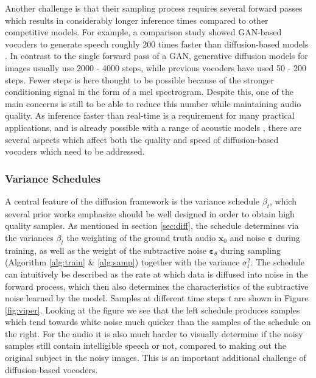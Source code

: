 \documentclass{report}
\begin{document}
Another challenge is that their sampling process requires several forward passes which results in considerably longer inference times compared to other competitive models. For example, a comparison study showed GAN-based vocoders to generate speech roughly 200 times faster than diffusion-based models \cite{albadawy2022vocbench}. In contrast to the single forward pass of a GAN, generative diffusion models for images usually use 2000 - 4000 steps, while previous vocoders have used 50 - 200 steps. Fewer steps is here thought to be possible because of the stronger conditioning signal in the form of a mel spectrogram. Despite this, one of the main concerns is still to be able to reduce this number while maintaining audio quality. As inference faster than real-time is a requirement for many practical applications, and is already possible with a range of acoustic models \cite{ren2020fastspeech, luo2021lightspeech}, there are several aspects which affect both the quality and speed of diffusion-based vocoders which need to be addressed.

\subsubsection{Variance Schedules}
A central feature of the diffusion framework is the variance schedule $\beta_t$, which several prior works emphasize should be well designed in order to obtain high quality samples. As mentioned in section \ref{sec:diff}, the schedule determines via the variances $\beta_t$ the weighting of the ground truth audio $\bm{x}_0$ and noise $\bm{\varepsilon}$ during training, as well as the weight of the subtractive noise $\bm{\varepsilon}_{\theta}$ during sampling (Algorithm \ref{alg:train} \& \ref{alg:samp}) together with the variance $\sigma_t^2$. The schedule can intuitively be described as the rate at which data is diffused into noise in the forward process, which then also determines the characteristics of the subtractive noise learned by the model. Samples at different time steps $t$ are shown in Figure \ref{fig:viper}. Looking at the figure we see that the left schedule produces samples which tend towards white noise much quicker than the samples of the schedule on the right. For the audio it is also much harder to visually determine if the noisy samples still contain intelligible speech or not, compared to making out the original subject in the noisy images. This is an important additional challenge of diffusion-based vocoders.
\end{document}
